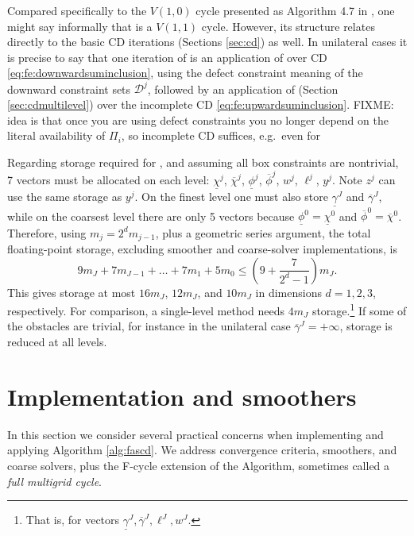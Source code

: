 \documentclass[letterpaper,final,12pt,reqno]{amsart}
\theoremstyle{cstyle}
\theoremstyle{cstyle*}
\theoremstyle{dstyle}
\numberwithin{equation}{section}
\numberwithin{figure}{section}
\numberwithin{table}{section}
\numberwithin{theorem}{section}
\begin{document}
Compared specifically to the $V(1,0)$ cycle presented as Algorithm 4.7 in \cite{GraeserKornhuber2009}, one might say informally that  is a $V(1,1)$ cycle.  However, its structure relates directly to the basic CD iterations (Sections \ref{sec:cd}) as well.  In unilateral cases it is precise to say that one iteration of  is an application of  over CD \eqref{eq:fe:downwardsuminclusion}, using the defect constraint meaning of the downward constraint sets $\mathcal{D}^j$, followed by an application of  (Section \ref{sec:cdmultilevel}) over the incomplete CD \eqref{eq:fe:upwardsuminclusion}.  FIXME: idea is that once you are using defect constraints you no longer depend on the literal availability of $\Pi_i$, so incomplete CD suffices, e.g.~even for 

Regarding storage required for , and assuming all box constraints are nontrivial, 7 vectors must be allocated on each level: $\underline{\chi}^j$, $\overline{\chi}^j$, $\underline{\phi}^j$, $\overline{\phi}^j$, $w^j$, $\ell^j$, $y^j$.  Note $z^j$ can use the same storage as $y^j$.  On the finest level one must also store $\underline{\gamma}^J$ and $\overline{\gamma}^J$, while on the coarsest level there are only 5 vectors because $\underline{\phi}^0=\underline{\chi}^0$ and $\overline{\phi}^0=\overline{\chi}^0$.  Therefore, using $m_j=2^d m_{j-1}$, plus a geometric series argument, the total floating-point storage, excluding smoother and coarse-solver implementations, is
\begin{equation}
9 m_J + 7 m_{J-1} + \dots + 7 m_1 + 5 m_0 \le \left(9 + \frac{7}{2^d - 1}\right) m_J.
\end{equation}
This gives storage at most $16m_J$, $12m_J$, and $10m_J$ in dimensions $d=1,2,3$, respectively.  For comparison, a single-level method needs $4 m_J$ storage.\footnote{That is, for vectors $\underline{\gamma}^J,\overline{\gamma}^J,\ell^J,w^J$.}  If some of the obstacles are trivial, for instance in the unilateral case $\overline{\gamma}^J=+\infty$, storage is reduced at all levels.


\section{Implementation and smoothers} \label{sec:implementation}

In this section we consider several practical concerns when implementing and applying  Algorithm \ref{alg:fascd}.  We address convergence criteria, smoothers, and coarse solvers, plus the F-cycle extension of the Algorithm, sometimes called a \emph{full multigrid cycle}.
\end{document}
